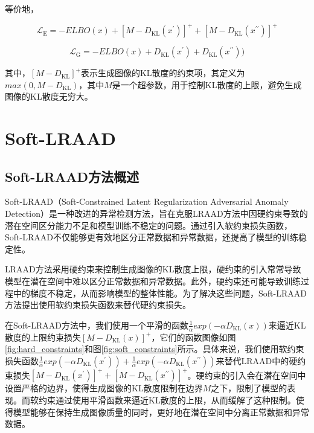 \documentclass{article}
\begin{document}
等价地，

\begin{equation}
  \mathcal{L}_{\mathrm{E}}=-ELBO(x) + [M - D_{\mathrm{KL}}(x^\prime)]^{+} + [M - D_{\mathrm{KL}}(x^{\prime\prime})]^{+}
\end{equation}

\begin{equation}
  \mathcal{L}_{\text {G}}=-ELBO(x) + D_\mathrm{KL}(x^\prime) + D_\mathrm{KL}(x^{\prime\prime}))
\end{equation}

其中，$[M - D_{\mathrm{KL}}]^{+}$表示生成图像的KL散度的约束项，其定义为$max(0, M - D_{\mathrm{KL}})$，其中$M$是一个超参数，用于控制KL散度的上限，避免生成图像的KL散度无穷大。




\section{Soft-LRAAD}

\subsection{Soft-LRAAD方法概述}

Soft-LRAAD（Soft-Constrained Latent Regularization Adversarial Anomaly Detection）是一种改进的异常检测方法，旨在克服LRAAD方法中因硬约束导致的潜在空间区分能力不足和模型训练不稳定的问题。通过引入软约束损失函数，Soft-LRAAD不仅能够更有效地区分正常数据和异常数据，还提高了模型的训练稳定性。

LRAAD方法采用硬约束来控制生成图像的KL散度上限，硬约束的引入常常导致模型在潜在空间中难以区分正常数据和异常数据。此外，硬约束还可能导致训练过程中的梯度不稳定，从而影响模型的整体性能。为了解决这些问题，Soft-LRAAD方法提出使用软约束损失函数来替代硬约束损失。

在Soft-LRAAD方法中，我们使用一个平滑的函数$\frac{1}{\alpha}exp(- \alpha D_{\mathrm{KL}}(x))$来逼近KL散度的上限约束损失$[M - D_{\mathrm{KL}}(x)]^{+}$，它们的函数图像如图\ref{fig:hard_constraints}和图\ref{fig:soft_constraints}所示。具体来说，我们使用软约束损失函数$\frac{1}{\alpha}exp(- \alpha D_{\mathrm{KL}}(x^\prime)) + \frac{1}{\alpha}exp(-\alpha D_{\mathrm{KL}}(x^{\prime\prime}))$来替代LRAAD中的硬约束损失$[M - D_{\mathrm{KL}}(x^\prime)]^{+} + [M - D_{\mathrm{KL}}(x^{\prime\prime})]^{+}$。硬约束的引入会在潜在空间中设置严格的边界，使得生成图像的KL散度限制在边界$M$之下，限制了模型的表现。而软约束通过使用平滑函数来逼近KL散度的上限，从而缓解了这种限制。使得模型能够在保持生成图像质量的同时，更好地在潜在空间中分离正常数据和异常数据。
\end{document}
